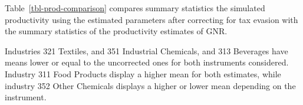 \documentclass[
  12pt]{article}
\theoremstyle{definition}
\theoremstyle{remark}
\begin{document}
Table~\ref{tbl-prod-comparison} compares summary statistics the
simulated productivity using the estimated parameters after correcting
for tax evasion with the summary statistics of the productivity
estimates of GNR.

\begin{table}

\caption{\label{tbl-prod-comparison}Summary statistics of the
productivity estimates using GNR correcting and not correcting for tax
evasion. Tax-evasion corrected estimates were simulated using the
parameters of \textbf{?@tbl-boot-omega}, with 1000 draws.}


\end{table}%

Industries 321 Textiles, and 351 Industrial Chemicals, and 313 Beverages
have means lower or equal to the uncorrected ones for both instruments
considered. Industry 311 Food Products display a higher mean for both
estimates, while industry 352 Other Chemicals displays a higher or lower
mean depending on the instrument.
\end{document}
